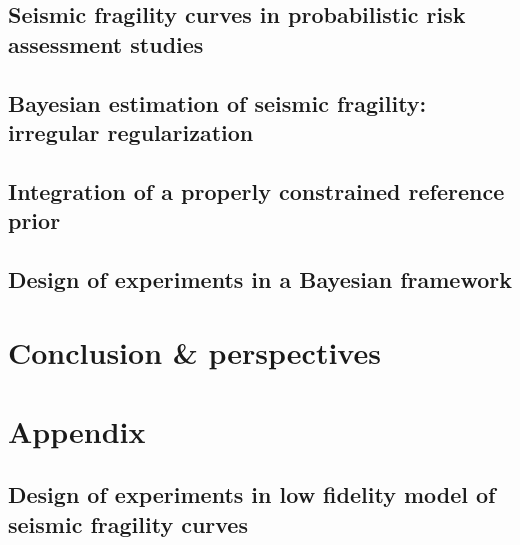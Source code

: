 \documentclass[a4paper]{book}
\begin{document}
\chapter{Seismic fragility curves in probabilistic risk assessment studies}\label{chap:frags-intro}




\chapter{Bayesian estimation of seismic fragility: irregular regularization}\label{chap:prem}




\chapter{Integration of a properly constrained reference prior}\label{chap:constrained-frags}




\chapter{Design of experiments in a Bayesian framework}\label{chap:doe}






\part{Conclusion \& perspectives}\label{part:conclusion}


\appendix
\part*{Appendix}\label{part:appendix}


\chapter{Design of experiments in low fidelity model of seismic fragility curves}\label{app:chap:ESAIM}



 
\printbibliography 
{}
\end{document}
